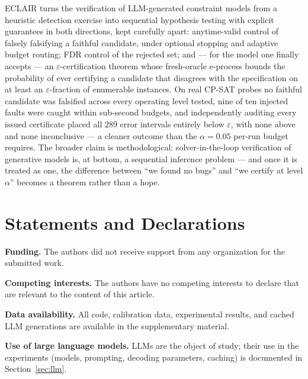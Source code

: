 \documentclass[pdflatex,sn-mathphys-num]{sn-jnl}
\theoremstyle{thmstyleone}
\theoremstyle{thmstyletwo}
\begin{document}
ECLAIR turns the verification of LLM-generated constraint models from
a heuristic detection exercise into sequential hypothesis testing
with explicit guarantees in both directions, kept carefully apart:
anytime-valid control of falsely falsifying a faithful candidate,
under optional stopping and adaptive budget routing; FDR control of
the rejected set; and --- for the model one finally accepts --- an
$\varepsilon$-certification theorem whose fresh-oracle e-process
bounds the probability of ever certifying a candidate that disagrees
with the specification on at least an $\varepsilon$-fraction of
enumerable instances. On real CP-SAT probes no faithful candidate was
falsified across every operating level tested, nine of ten injected
faults were caught within sub-second budgets, and independently auditing every
issued certificate placed all $289$ error intervals entirely
below $\varepsilon$, with none above and none inconclusive --- a
cleaner outcome than the $\alpha = 0.05$ per-run budget requires. The broader claim is methodological:
solver-in-the-loop verification of generative models is, at bottom, a
sequential inference problem --- and once it is treated as one, the
difference between ``we found no bugs'' and ``we certify at level
$\alpha$'' becomes a theorem rather than a hope.

\backmatter

\section*{Statements and Declarations}

\textbf{Funding.} %
The authors did not receive support from any organization for the
submitted work.

\textbf{Competing interests.} %
The authors have no competing interests to declare that are relevant
to the content of this article.

\textbf{Data availability.} All code, calibration data, experimental
results, and cached LLM generations are available in the
supplementary material.

\textbf{Use of large language models.} LLMs are the object of study;
their use in the experiments (models, prompting, decoding parameters,
caching) is documented in Section~\ref{sec:llm}.
\end{document}
